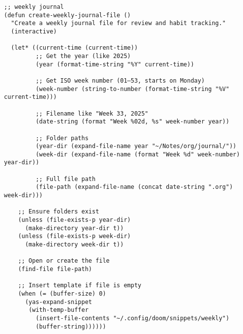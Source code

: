 \documentclass[11pt]{article}
\begin{document}
\begin{verbatim}
;; weekly journal
(defun create-weekly-journal-file ()
  "Create a weekly journal file for review and habit tracking."
  (interactive)

  (let* ((current-time (current-time))
         ;; Get the year (like 2025)
         (year (format-time-string "%Y" current-time))

         ;; Get ISO week number (01–53, starts on Monday)
         (week-number (string-to-number (format-time-string "%V" current-time)))

         ;; Filename like "Week 33, 2025"
         (date-string (format "Week %02d, %s" week-number year))

         ;; Folder paths
         (year-dir (expand-file-name year "~/Notes/org/journal/"))
         (week-dir (expand-file-name (format "Week %d" week-number) year-dir))

         ;; Full file path
         (file-path (expand-file-name (concat date-string ".org") week-dir)))

    ;; Ensure folders exist
    (unless (file-exists-p year-dir)
      (make-directory year-dir t))
    (unless (file-exists-p week-dir)
      (make-directory week-dir t))

    ;; Open or create the file
    (find-file file-path)

    ;; Insert template if file is empty
    (when (= (buffer-size) 0)
      (yas-expand-snippet
       (with-temp-buffer
         (insert-file-contents "~/.config/doom/snippets/weekly")
         (buffer-string))))))
\end{verbatim}
\end{document}
